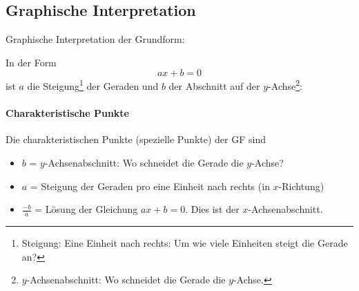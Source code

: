 

\newpage
\subsection{Graphische Interpretation}
Graphische Interpretation der Grundform:

In der Form
$$ax+b=0$$
ist $a$ die Steigung\footnote{Steigung: Eine Einheit nach rechts: Um wie viele Einheiten steigt die Gerade an?} der Geraden und $b$ der Abschnitt auf der $y$-Achse\footnote{$y$-Achsenabschnitt: Wo schneidet die Gerade die $y$-Achse.}:


  \paragraph{Charakteristische Punkte}
  Die charakteristischen Punkte (spezielle Punkte) der GF sind

  \begin{itemize}
  \item $b$ = $y$-Achsenabschnitt: Wo schneidet die Gerade die $y$-Achse?
  \item $a$ = Steigung der Geraden pro eine Einheit nach rechts (in $x$-Richtung)
  \item $\frac{-b}{a}$ = Lösung der Gleichung $ax+b=0$. Dies ist der $x$-Achsenabschnitt.
  \end{itemize}

